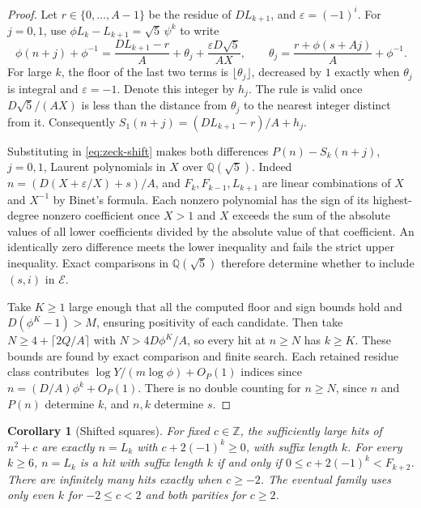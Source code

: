 \documentclass[11pt,reqno,a4paper]{amsart}
\newtheorem{corollary}[theorem]{Corollary}
\theoremstyle{remark}
\begin{document}
\begin{proof}
Let \(r\in\{0,\ldots,A-1\}\) be the residue of \(D L_{k+1}\), and
\(\varepsilon=(-1)^i\). For \(j=0,1\), use
\(\phi L_k-L_{k+1}=\sqrt5\,\psi^k\) to write
\[
 \phi(n+j)+\phi^{-1}
 =\frac{D L_{k+1}-r}{A}+\theta_j+
   \frac{\varepsilon D\sqrt5}{AX},\qquad
 \theta_j=\frac{r+\phi(s+Aj)}{A}+\phi^{-1}.
\]
For large \(k\), the floor of the last two terms is \(\lfloor\theta_j\rfloor\),
decreased by \(1\) exactly when \(\theta_j\) is integral and
\(\varepsilon=-1\). Denote this integer by \(h_j\). The rule is
valid once \(D\sqrt5/(AX)\) is less than the distance from
\(\theta_j\) to the nearest integer distinct from it. Consequently
\(S_1(n+j)=(D L_{k+1}-r)/A+h_j\).

Substituting in \eqref{eq:zeck-shift} makes both differences
\(P(n)-S_k(n+j)\), \(j=0,1\), Laurent polynomials in \(X\) over
\(\mathbb Q(\sqrt5)\). Indeed \(n=(D(X+\varepsilon/X)+s)/A\),
and \(F_k,F_{k-1},L_{k+1}\) are linear combinations of \(X\)
and \(X^{-1}\) by Binet's formula. Each nonzero polynomial has
the sign of its highest-degree nonzero coefficient once \(X>1\)
and \(X\) exceeds the sum of the absolute values of all lower
coefficients divided by the absolute value of that coefficient.
An identically zero difference meets the lower inequality and
fails the strict upper inequality. Exact comparisons in
\(\mathbb Q(\sqrt5)\) therefore determine whether to include
\((s,i)\) in \(\mathcal E\).

Take \(K\ge1\) large enough that all the computed floor and sign
bounds hold and \(D(\phi^K-1)>M\), ensuring positivity of each
candidate. Then take \(N\ge 4+\lceil 2Q/A\rceil\) with
\(N>4D\phi^K/A\), so every hit at \(n\ge N\) has \(k\ge K\).
These bounds are found by exact comparison and finite search.
Each retained residue class contributes
\(\log Y/(m\log\phi)+O_P(1)\) indices since
\(n=(D/A)\phi^k+O_P(1)\). There is no double counting for \(n\ge N\),
since \(n\) and \(P(n)\) determine \(k\), and \(n,k\) determine \(s\).
\end{proof}

\begin{corollary}[Shifted squares]\label{cor:zeck-square}
For fixed \(c\in\mathbb Z\), the sufficiently large hits of \(n^2+c\)
are exactly \(n=L_k\) with \(c+2(-1)^k\ge0\), with suffix length \(k\).
For every \(k\ge6\), \(n=L_k\) is a hit with suffix length \(k\)
if and only if \(0\le c+2(-1)^k<F_{k+2}\).
There are infinitely many hits exactly when \(c\ge-2\). The eventual
family uses only even \(k\) for \(-2\le c<2\) and both parities
for \(c\ge2\).
\end{corollary}
\end{document}
